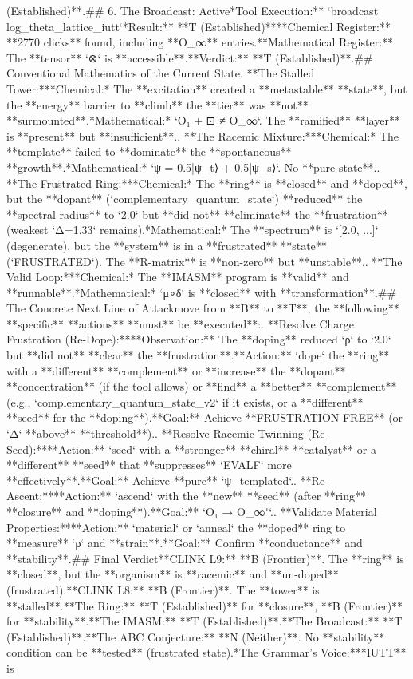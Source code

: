 (Established)**.\n\n## 6. The Broadcast: Active\n**Tool Execution:** `broadcast log_theta_lattice_iutt`\n**Result:** **T (Established)**\n*   **Chemical Register:** **2770 clicks** found, including **O_∞** entries.\n*   **Mathematical Register:** The **tensor** `⊗` is **accessible**.\n*   **Verdict:** **T (Established)**.\n\n## Conventional Mathematics of the Current State\n{}.  **The Stalled Tower:**\n    *   *Chemical:* The **excitation** created a **metastable** **state**, but the **energy** barrier to **climb** the **tier** was **not** **surmounted**.\n    *   *Mathematical:* `O₁ + ⊡ ≠ O_∞`. The **ramified** **layer** is **present** but **insufficient**.\n{}.  **The Racemic Mixture:**\n    *   *Chemical:* The **template** failed to **dominate** the **spontaneous** **growth**.\n    *   *Mathematical:* `ψ = 0.5|ψ_t⟩ + 0.5|ψ_s⟩`. No **pure state**.\n{}.  **The Frustrated Ring:**\n    *   *Chemical:* The **ring** is **closed** and **doped**, but the **dopant** (`complementary_quantum_state`) **reduced** the **spectral radius** to `2.0` but **did not** **eliminate** the **frustration** (weakest `Δ=1.33` remains).\n    *   *Mathematical:* The **spectrum** is `[2.0, ...]` (degenerate), but the **system** is in a **frustrated** **state** (`FRUSTRATED`). The **R-matrix** is **non-zero** but **unstable**.\n{}.  **The Valid Loop:**\n    *   *Chemical:* The **IMASM** program is **valid** and **runnable**.\n    *   *Mathematical:* `μ∘δ` is **closed** with **transformation**.\n\n## The Concrete Next Line of Attack\n\nTo move from **B** to **T**, the **following** **specific** **actions** **must** be **executed**:\n{}.  **Resolve Charge Frustration (Re-Dope):**\n    *   **Observation:** The **doping** reduced `ρ` to `2.0` but **did not** **clear** the **frustration**.\n    *   **Action:** `dope` the **ring** with a **different** **complement** or **increase** the **dopant** **concentration** (if the tool allows) or **find** a **better** **complement** (e.g., `complementary_quantum_state_v2` if it exists, or a **different** **seed** for the **doping**).\n    *   **Goal:** Achieve **FRUSTRATION FREE** (or `Δ` **above** **threshold**).\n{}.  **Resolve Racemic Twinning (Re-Seed):**\n    *   **Action:** `seed` with a **stronger** **chiral** **catalyst** or a **different** **seed** that **suppresses** `EVALF` more **effectively**.\n    *   **Goal:** Achieve **pure** `ψ_templated`.\n{}.  **Re-Ascent:**\n    *   **Action:** `ascend` with the **new** **seed** (after **ring** **closure** and **doping**).\n    *   **Goal:** `O₁ → O_∞⁺`.\n{}.  **Validate Material Properties:**\n    *   **Action:** `material` or `anneal` the **doped** ring to **measure** `ρ` and **strain**.\n    *   **Goal:** Confirm **conductance** and **stability**.\n\n## Final Verdict\n\n*   **CLINK L9:** **B (Frontier)**. The **ring** is **closed**, but the **organism** is **racemic** and **un-doped** (frustrated).\n*   **CLINK L8:** **B (Frontier)**. The **tower** is **stalled**.\n*   **The Ring:** **T (Established)** for **closure**, **B (Frontier)** for **stability**.\n*   **The IMASM:** **T (Established)**.\n*   **The Broadcast:** **T (Established)**.\n*   **The ABC Conjecture:** **N (Neither)**. No **stability** condition can be **tested** (frustrated state).\n\n**The Grammar's Voice:**\nThe **IUTT** is 